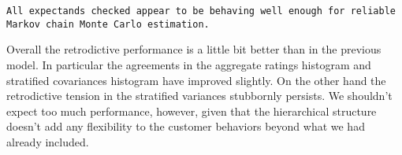 \documentclass[
  letterpaper,
  DIV=11,
  numbers=noendperiod]{scrartcl}
\newenvironment{Shaded}{\begin{snugshade}}{\end{snugshade}}
\newcommand{\AttributeTok}[1]{\textcolor[rgb]{0.40,0.45,0.13}{#1}}
\newcommand{\ConstantTok}[1]{\textcolor[rgb]{0.56,0.35,0.01}{#1}}
\newcommand{\DecValTok}[1]{\textcolor[rgb]{0.68,0.00,0.00}{#1}}
\newcommand{\FloatTok}[1]{\textcolor[rgb]{0.68,0.00,0.00}{#1}}
\newcommand{\FunctionTok}[1]{\textcolor[rgb]{0.28,0.35,0.67}{#1}}
\newcommand{\NormalTok}[1]{\textcolor[rgb]{0.00,0.23,0.31}{#1}}
\newcommand{\OtherTok}[1]{\textcolor[rgb]{0.00,0.23,0.31}{#1}}
\newcommand{\SpecialCharTok}[1]{\textcolor[rgb]{0.37,0.37,0.37}{#1}}
\newcommand{\StringTok}[1]{\textcolor[rgb]{0.13,0.47,0.30}{#1}}
\begin{document}
\begin{Shaded}
\end{Shaded}

\begin{verbatim}
All expectands checked appear to be behaving well enough for reliable
Markov chain Monte Carlo estimation.
\end{verbatim}

Overall the retrodictive performance is a little bit better than in the
previous model. In particular the agreements in the aggregate ratings
histogram and stratified covariances histogram have improved slightly.
On the other hand the retrodictive tension in the stratified variances
stubbornly persists. We shouldn't expect too much performance, however,
given that the hierarchical structure doesn't add any flexibility to the
customer behaviors beyond what we had already included.

\begin{Shaded}
\end{Shaded}
\end{document}
